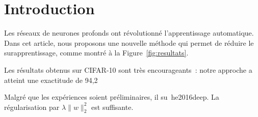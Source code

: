 \documentclass{article}
\begin{document}
\section{Introduction}

Les réseaux de neurones profonds ont révolutionné l'apprentissage automatique.
Dans cet article, nous proposons une nouvelle méthode qui permet de réduire
le surapprentissage, comme montré à la Figure~\ref{fig:resultats}.

Les résultats obtenus sur CIFAR-10 sont très encourageants~: notre approche a atteint une exactitude de 94,2~%

Malgré que les expériences soient préliminaires, il su~he2016deep.
La régularisation par $\lambda \|w\|_2^2$ est suffisante.
\end{document}
